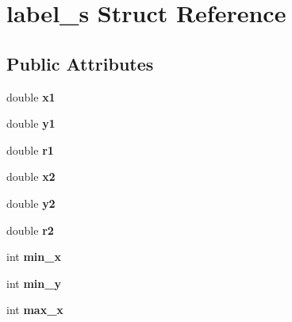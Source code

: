 \hypertarget{structlabel__s}{\section{label\-\_\-s Struct Reference}
\label{structlabel__s}
}
\subsection*{Public Attributes}
\begin{DoxyCompactItemize}
\item 
\hypertarget{structlabel__s_a20316c222dc3c07f02a3861211360ea8}{double {\bfseries x1}}\label{structlabel__s_a20316c222dc3c07f02a3861211360ea8}

\item 
\hypertarget{structlabel__s_a5f14c0b98f91084dae916ae4121ea74e}{double {\bfseries y1}}\label{structlabel__s_a5f14c0b98f91084dae916ae4121ea74e}

\item 
\hypertarget{structlabel__s_aca35a7298ee0dd1305cb671e9db04de2}{double {\bfseries r1}}\label{structlabel__s_aca35a7298ee0dd1305cb671e9db04de2}

\item 
\hypertarget{structlabel__s_a76c22e8d3b6528a1d6cd957996244fac}{double {\bfseries x2}}\label{structlabel__s_a76c22e8d3b6528a1d6cd957996244fac}

\item 
\hypertarget{structlabel__s_af4a64bd81a848921e9f9018e3fbcce18}{double {\bfseries y2}}\label{structlabel__s_af4a64bd81a848921e9f9018e3fbcce18}

\item 
\hypertarget{structlabel__s_aeda08845c2f71a95bfdd7dbe1d9a4a5e}{double {\bfseries r2}}\label{structlabel__s_aeda08845c2f71a95bfdd7dbe1d9a4a5e}

\item 
\hypertarget{structlabel__s_aceaad61ce45acbcad8c0f0c46f8b599b}{int {\bfseries min\-\_\-x}}\label{structlabel__s_aceaad61ce45acbcad8c0f0c46f8b599b}

\item 
\hypertarget{structlabel__s_ae045136612fac493b0ae0231e35f6ccd}{int {\bfseries min\-\_\-y}}\label{structlabel__s_ae045136612fac493b0ae0231e35f6ccd}

\item 
\hypertarget{structlabel__s_a7ad05e7e2dcc0d84cc4d3e12ec40e3de}{int {\bfseries max\-\_\-x}}\label{structlabel__s_a7ad05e7e2dcc0d84cc4d3e12ec40e3de}


\end{DoxyCompactItemize}
